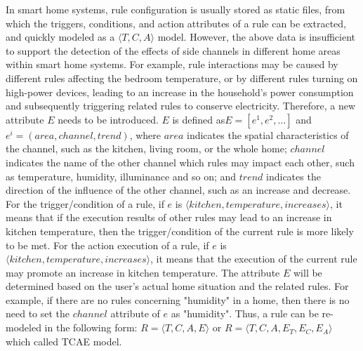 In smart home systems, rule configuration is usually stored as static files, from which the triggers, conditions, and action attributes of a rule can be extracted, and quickly modeled as a $\langle T,C,A \rangle$ model. However, the above data is insufficient to support the detection of the effects of side channels in different home areas within smart home systems. For example, rule interactions may be caused by different rules affecting the bedroom temperature, or by different rules turning on high-power devices, leading to an increase in the household's power consumption and subsequently triggering related rules to conserve electricity. Therefore, a new attribute $E$ needs to be introduced. $E$ is defined as$E=[e^1, e^2,\dots]$ and $e^i=(area, channel, trend)$, where $area$ indicates the spatial characteristics of the channel, such as the kitchen, living room, or the whole home; $channel$ indicates the name of the other channel which rules may impact each other, such as temperature, humidity, illuminance and so on; and $trend$ indicates the direction of the influence of the other channel, such as an increase and decrease. For the trigger/condition of a rule, if $e$ is $\langle kitchen, temperature, increases\rangle$, it means that if the execution results of other rules may lead to an increase in kitchen temperature, then the trigger/condition of the current rule is more likely to be met. For the action execution of a rule, if $e$ is $\langle kitchen, temperature, increases\rangle$, it means that the execution of the current rule may promote an increase in kitchen temperature. The attribute $E$ will be determined based on the user's actual home situation and the related rules. For example, if there are no rules concerning "humidity" in a home, then there is no need to set the $channel$ attribute of $e$ as "humidity". Thus, a rule can be re-modeled in the following form: $R=\langle T,C,A,E\rangle $ or $R=\langle T,C,A,E_T,E_C,E_A \rangle$ which called TCAE model.

